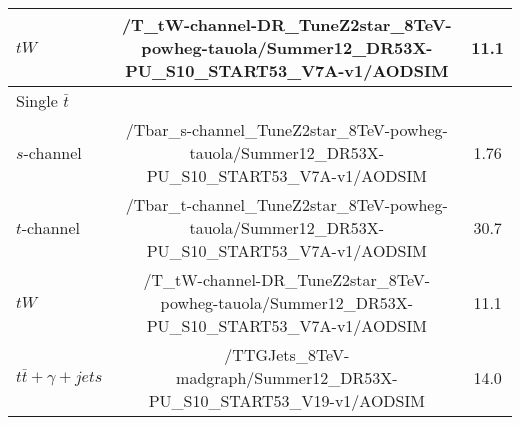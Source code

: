 \documentclass[landscape]{article}
\begin{document}
\begin{small}
\begin{center}
\begin{tabular}{ | l | c | c | }
      \-$tW$ & /T\_tW-channel-DR\_TuneZ2star\_8TeV-powheg-tauola/Summer12\_DR53X-PU\_S10\_START53\_V7A-v1/AODSIM & 11.1 \\
      \hline
      Single $\bar{t}$ & & \\
      \-$s$-channel & /Tbar\_s-channel\_TuneZ2star\_8TeV-powheg-tauola/Summer12\_DR53X-PU\_S10\_START53\_V7A-v1/AODSIM & 1.76 \\
      \-$t$-channel & /Tbar\_t-channel\_TuneZ2star\_8TeV-powheg-tauola/Summer12\_DR53X-PU\_S10\_START53\_V7A-v1/AODSIM & 30.7 \\
      \-$tW$ & /T\_tW-channel-DR\_TuneZ2star\_8TeV-powheg-tauola/Summer12\_DR53X-PU\_S10\_START53\_V7A-v1/AODSIM & 11.1 \\
      \hline
      $t\bar{t} + \gamma + jets$ & /TTGJets\_8TeV-madgraph/Summer12\_DR53X-PU\_S10\_START53\_V19-v1/AODSIM & 14.0 \\
      \hline \hline
    \end{tabular}


  \end{center}
  
\end{small}
\end{document}

